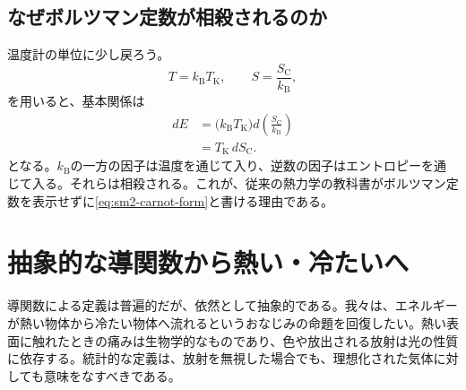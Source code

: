 \subsection{なぜボルツマン定数が相殺されるのか}

温度計の単位に少し戻ろう。
\[
 T=k_{\mathrm B}T_{\mathrm K},
 \qquad
 S=\frac{S_{\mathrm C}}{k_{\mathrm B}},
\]
を用いると、基本関係は
\begin{align}
 dE
 &=\bigl(k_{\mathrm B}T_{\mathrm K}\bigr)
   d\left(\frac{S_{\mathrm C}}{k_{\mathrm B}}\right)\\
 &=T_{\mathrm K}\,dS_{\mathrm C}.
 \label{eq:sm2-carnot-form}
\end{align}
となる。\(k_{\mathrm B}\)の一方の因子は温度を通じて入り、逆数の因子はエントロピーを通じて入る。それらは相殺される。これが、従来の熱力学の教科書がボルツマン定数を表示せずに\eqref{eq:sm2-carnot-form}と書ける理由である。

\begin{classroomqa}
\end{classroomqa}

\section{抽象的な導関数から熱い・冷たいへ}

導関数による定義は普遍的だが、依然として抽象的である。我々は、エネルギーが熱い物体から冷たい物体へ流れるというおなじみの命題を回復したい。熱い表面に触れたときの痛みは生物学的なものであり、色や放出される放射は光の性質に依存する。統計的な定義は、放射を無視した場合でも、理想化された気体に対しても意味をなすべきである。

\begin{classroomqa}
\end{classroomqa}


